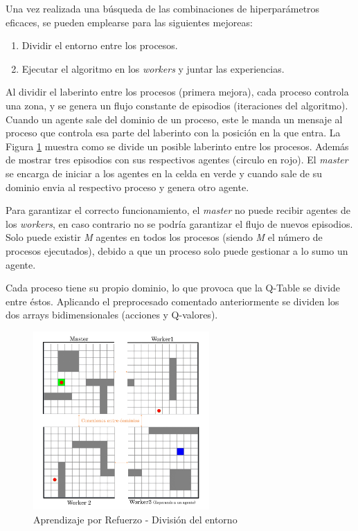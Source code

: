		

		Una vez realizada una búsqueda de las combinaciones de hiperparámetros eficaces, se pueden emplearse para las siguientes mejoreas:
		
		\begin{enumerate}
			\item Dividir el entorno entre los procesos.
			\item Ejecutar el algoritmo en los \textit{workers} y juntar las experiencias.
		\end{enumerate}

	
		
		Al dividir el laberinto entre los procesos (primera mejora), cada proceso controla una zona, y se genera un flujo constante de episodios (iteraciones del algoritmo). Cuando un agente sale del dominio de un proceso, este le manda un mensaje al proceso que controla esa parte del laberinto con la posición en la que entra. La Figura \ref{fig:rlmpi} muestra como se divide un posible laberinto entre los procesos. Además de mostrar tres episodios con sus respectivos agentes (circulo en rojo). El \textit{master} se encarga de iniciar a los agentes en la celda en verde y cuando sale de su dominio envia al respectivo proceso y genera otro agente. 
		
		Para garantizar el correcto funcionamiento, el \textit{master} no puede recibir agentes de los \textit{workers}, en caso contrario no se podría garantizar el flujo de nuevos episodios. Solo puede existir \textit{M} agentes en todos los procesos (siendo \textit{M} el número de procesos ejecutados), debido a que un proceso solo puede gestionar a lo sumo un agente. 
		
		Cada proceso tiene su propio dominio, lo que provoca que la Q-Table se divide entre éstos. Aplicando el preprocesado comentado anteriormente se dividen los dos arrays bidimensionales (acciones y Q-valores). 
		
		
		
		\begin{figure}[!h]
			\centering
			\includegraphics[width=0.6\textwidth]{images/chapter_3/rl_mpi}	
			\caption{Aprendizaje por Refuerzo - División del entorno}
			\label{fig:rlmpi}
		\end{figure}
	

